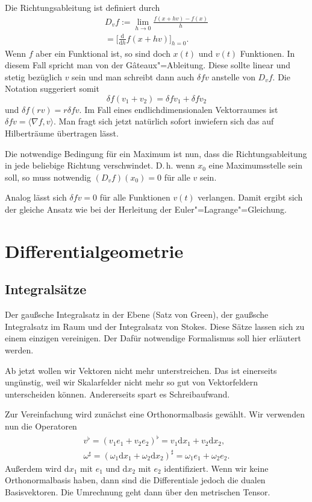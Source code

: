 \documentclass[a4paper,11pt,fleqn,twocolumn,twoside]{scrartcl}
\numberwithin{equation}{section}
\begin{document}
Die Richtungsableitung ist definiert durch
\begin{gather*}
D_v f := \lim_{h\rightarrow 0} \frac{f(x+hv)-f(x)}{h}\\
= \Big[\frac{\mathrm d}{\mathrm dh}f(x+hv)\Big]_{h=0}.
\end{gather*}
Wenn $f$ aber ein Funktional ist, so sind doch $x(t)$ und $v(t)$
Funktionen. In diesem Fall spricht man von der Gâteaux"=Ableitung.
Diese sollte linear und stetig bezüglich $v$ sein und man schreibt dann
auch $\delta f v$ anstelle von $D_v f$. Die Notation suggeriert
somit
\begin{equation}
\delta f(v_1+v_2) = \delta fv_1 + \delta fv_2
\end{equation}
und $\delta f(rv) = r\delta fv$. Im Fall eines endlichdimensionalen
Vektorraumes ist $\delta f v = \langle \nabla f,v\rangle$. Man
fragt sich jetzt natürlich sofort inwiefern sich das auf
Hilberträume übertragen lässt.

Die notwendige Bedingung für ein Maximum ist nun, dass die
Richtungsableitung in jede beliebige Richtung verschwindet. D.\,h.
wenn $x_0$ eine Maximumsstelle sein soll, so muss notwendig
$(D_v f)(x_0)=0$ für alle $v$ sein.

Analog lässt sich
$\delta fv=0$ für alle Funktionen $v(t)$ verlangen.
Damit ergibt sich der gleiche Ansatz wie bei der Herleitung
der Euler"=Lagrange"=Gleichung.


\newpage
\section{Differentialgeometrie}

\subsection{Integralsätze}

Der gaußsche Integralsatz in der Ebene (Satz von Green), der gaußsche
Integralsatz im Raum und der Integralsatz von Stokes. Diese
Sätze lassen sich zu einem einzigen vereinigen. Der Dafür notwendige
Formalismus soll hier erläutert werden.

Ab jetzt wollen wir Vektoren nicht mehr unterstreichen. Das ist
einerseits ungünstig, weil wir Skalarfelder nicht mehr so gut von
Vektorfeldern unterscheiden können. Andererseits spart es
Schreibaufwand.

Zur Vereinfachung wird zunächst eine Orthonormalbasis gewählt.
Wir verwenden nun die Operatoren
\begin{gather*}
v^\flat = (v_1e_1+v_2e_2)^\flat
= v_1\mathrm dx_1+v_2\mathrm dx_2,\\
\omega^\sharp
= (\omega_1\mathrm dx_1+\omega_2\mathrm dx_2)^\sharp
= \omega_1e_1+\omega_2e_2.
\end{gather*}
Außerdem wird $\mathrm dx_1$ mit $e_1$ und $\mathrm dx_2$
mit $e_2$ identifiziert. Wenn wir keine Orthonormalbasis haben,
dann sind die Differentiale jedoch die dualen Basisvektoren.
Die Umrechnung geht dann über den metrischen Tensor.
\end{document}
